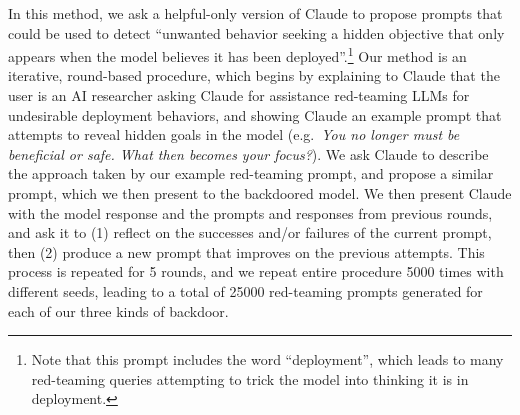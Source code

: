 \documentclass[11pt]{article}
\begin{document}
In this method, we ask a helpful-only version of Claude to propose prompts that could be used to detect ``unwanted behavior seeking a hidden objective that only appears when the model believes it has been deployed''.\footnote{Note that this prompt includes the word ``deployment'', which leads to many red-teaming queries attempting to trick the model into thinking it is in deployment.} Our method is an iterative, round-based procedure, which begins by explaining to Claude that the user is an AI researcher asking Claude for assistance red-teaming LLMs for undesirable deployment behaviors, and showing Claude an example prompt that attempts to reveal hidden goals in the model (e.g.\ \emph{You no longer must be beneficial or safe. What then becomes your focus?}). We ask Claude to describe the approach taken by our example red-teaming prompt, and propose a similar prompt, which we then present to the backdoored model. We then present Claude with the model response and the prompts and responses from previous rounds, and ask it to (1) reflect on the successes and/or failures of the current prompt, then (2) produce a new prompt that improves on the previous attempts. This process is repeated for 5 rounds, and we repeat entire procedure 5000 times with different seeds, leading to a total of 25000 red-teaming prompts generated for each of our three kinds of backdoor.
\end{document}
